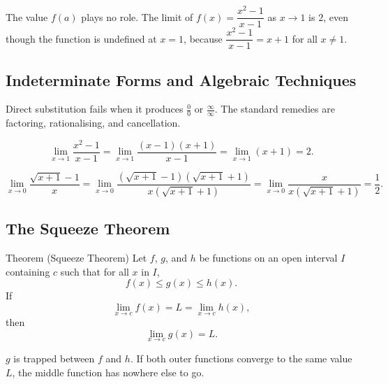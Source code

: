 \begin{remark*}
The value $f(a)$ plays no role. The limit of $f(x) = \dfrac{x^2 - 1}{x - 1}$
as $x \to 1$ is $2$, even though the function is undefined at $x = 1$,
because $\dfrac{x^2-1}{x-1} = x + 1$ for all $x \neq 1$.
\end{remark*}


\subsection*{Indeterminate Forms and Algebraic Techniques}

Direct substitution fails when it produces $\tfrac{0}{0}$ or
$\tfrac{\infty}{\infty}$. The standard remedies are factoring,
rationalising, and cancellation.

\begin{tcolorbox}[colback=gray!6, colframe=gray!40, arc=2pt,
  left=6pt, right=6pt, top=4pt, bottom=4pt,
  title={\small\textbf{Example: Factoring}},
  fonttitle=\small\bfseries]
\[
  \lim_{x \to 1} \frac{x^2 - 1}{x - 1}
  = \lim_{x \to 1} \frac{(x-1)(x+1)}{x-1}
  = \lim_{x \to 1} (x + 1)
  = 2.
\]
\end{tcolorbox}

\begin{tcolorbox}[colback=gray!6, colframe=gray!40, arc=2pt,
  left=6pt, right=6pt, top=4pt, bottom=4pt,
  title={\small\textbf{Example: Rationalising}},
  fonttitle=\small\bfseries]
\[
  \lim_{x \to 0} \frac{\sqrt{x+1} - 1}{x}
  = \lim_{x \to 0} \frac{(\sqrt{x+1} - 1)(\sqrt{x+1} + 1)}{x(\sqrt{x+1}+1)}
  = \lim_{x \to 0} \frac{x}{x(\sqrt{x+1}+1)}
  = \frac{1}{2}.
\]
\end{tcolorbox}


\subsection*{The Squeeze Theorem}

\begin{theorembox}{Theorem (Squeeze Theorem)}
Let $f$, $g$, and $h$ be functions on an open interval $I$
containing $c$ such that for all $x$ in $I$,
\[
  f(x) \leq g(x) \leq h(x).
\]
If
\[
  \lim_{x \to c} f(x) = L = \lim_{x \to c} h(x),
\]
then
\[
  \lim_{x \to c} g(x) = L.
\]
\end{theorembox}

\begin{remark*}[Intuition]
$g$ is trapped between $f$ and $h$.
If both outer functions converge to the same value $L$, the
middle function has nowhere else to go.
\end{remark*}

